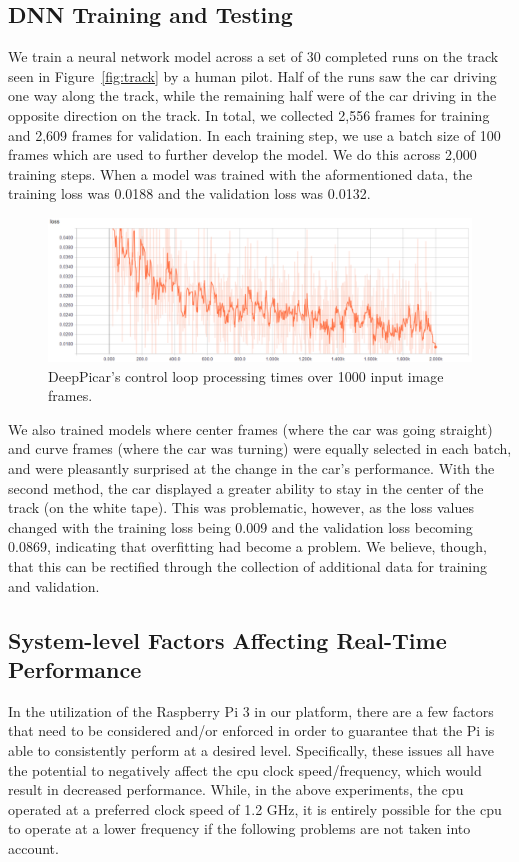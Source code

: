 \subsection{DNN Training and Testing}
We train a neural network model across a set of 30 completed runs on 
the track seen in Figure~\ref{fig:track} by a human pilot. Half of 
the runs saw the car driving one way along the track, while the 
remaining half were of the car driving in the opposite direction on 
the track. In total, we collected 2,556 frames for training and 2,609 
frames for validation. In each training step, we use a batch size of 
100 frames which are used to further develop the model. We do this 
across 2,000 training steps. When a model was trained with the 
aformentioned data, the training loss was 0.0188 and the validation 
loss was 0.0132. 

\begin{figure}[h]
  \centering
  \includegraphics[width=.55\textwidth]{figs/TrainingLoss}
  \caption{DeepPicar's control loop processing times over 1000 input 
image frames.}
  \label{fig:modelloss}
\end{figure}

We also trained models where center frames (where the car was going 
straight) and curve frames (where the car was turning) were equally 
selected in each batch, and were pleasantly surprised at the change 
in the car's performance. With the second method, the car displayed a 
greater ability to stay in the center of the track (on the white 
tape). This was problematic, however, as the loss values changed with 
the training loss being 0.009 and the validation loss becoming 
0.0869, indicating that overfitting had become a problem. We believe, 
though, that this can be rectified through the collection of 
additional data for training and validation.

\subsection{System-level Factors Affecting Real-Time Performance}
In the utilization of the Raspberry Pi 3 in our platform, there are a
few factors that need to be considered and/or enforced in order to
guarantee that the Pi is able to consistently perform at a desired
level. Specifically, these issues all have the potential to negatively
affect the cpu clock speed/frequency, which would result in decreased
performance. While, in the above experiments, the cpu operated at a
preferred clock speed of 1.2 GHz, it is entirely possible for the cpu
to operate at a lower frequency if the following problems are not
taken into account. 

